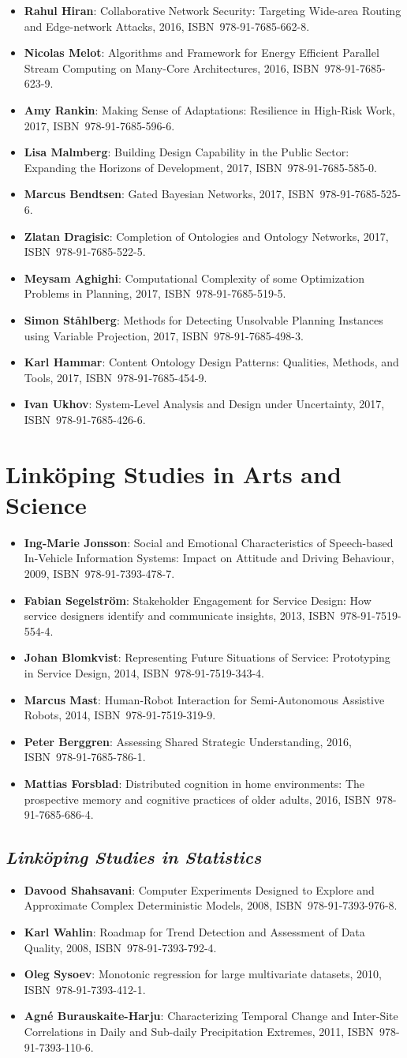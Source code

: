 \documentclass[a4paper,showtrims,twocolumn]{memoir}
\newcommand{\series}[1]{\section*{\footnotesize #1}}
\newcommand{\subseries}[1]{\subsection*{\footnotesize\normalfont\textit{#1}}}
\newenvironment{theses}{
  \begin{itemize}
    \setlength{\itemsep}{0.2em}
    \setlength{\parskip}{0em}
    \setlength{\parsep}{0em}
}{
  \end{itemize}
}
\newcommand{\thesis}[5]{\item[No.~#1] \textbf{#2}: #3, #4, ISBN~#5.}
\begin{document}
\begin{theses}
    \thesis{1798}{Rahul Hiran}{Collaborative Network Security: Targeting Wide-area Routing and Edge-network Attacks}{2016}{978-91-7685-662-8}
    \thesis{1813}{Nicolas Melot}{Algorithms and Framework for Energy Efficient Parallel Stream Computing on Many-Core Architectures}{2016}{978-91-7685-623-9}
    \thesis{1823}{Amy Rankin}{Making Sense of Adaptations: Resilience in High-Risk Work}{2017}{978-91-7685-596-6}
    \thesis{1831}{Lisa Malmberg}{Building Design Capability in the Public Sector: Expanding the Horizons of Development}{2017}{978-91-7685-585-0}
    \thesis{1851}{Marcus Bendtsen}{Gated Bayesian Networks}{2017}{978-91-7685-525-6}
    \thesis{1852}{Zlatan Dragisic}{Completion of Ontologies and Ontology Networks}{2017}{978-91-7685-522-5}
    \thesis{1854}{Meysam Aghighi}{Computational Complexity of some Optimization Problems in Planning}{2017}{978-91-7685-519-5}
    \thesis{1863}{Simon Ståhlberg}{Methods for Detecting Unsolvable Planning Instances using Variable Projection}{2017}{978-91-7685-498-3}
    \thesis{1879}{Karl Hammar}{Content Ontology Design Patterns: Qualities, Methods, and Tools}{2017}{978-91-7685-454-9}
    \thesis{1887}{Ivan Ukhov}{System-Level Analysis and Design under Uncertainty}{2017}{978-91-7685-426-6}
  \end{theses}

  \series{Linköping Studies in Arts and Science}

  \begin{theses}
    \thesis{504}{Ing-Marie Jonsson}{Social and Emotional Characteristics of Speech-based In-Vehicle Information Systems: Impact on Attitude and Driving Behaviour}{2009}{978-91-7393-478-7}
    \thesis{586}{Fabian Segelström}{Stakeholder Engagement for Service Design: How service designers identify and communicate insights}{2013}{978-91-7519-554-4}
    \thesis{618}{Johan Blomkvist}{Representing Future Situations of Service: Prototyping in Service Design}{2014}{978-91-7519-343-4}
    \thesis{620}{Marcus Mast}{Human-Robot Interaction for Semi-Autonomous Assistive Robots}{2014}{978-91-7519-319-9}
    \thesis{677}{Peter Berggren}{Assessing Shared Strategic Understanding}{2016}{978-91-7685-786-1}
    \thesis{695}{Mattias Forsblad}{Distributed cognition in home environments: The prospective memory and cognitive practices of older adults}{2016}{978-91-7685-686-4}
  \end{theses}

  \subseries{Linköping Studies in Statistics}

  \begin{theses}
    \thesis{9}{Davood Shahsavani}{Computer Experiments Designed to Explore and Approximate Complex Deterministic Models}{2008}{978-91-7393-976-8}
    \thesis{10}{Karl Wahlin}{Roadmap for Trend Detection and Assessment of Data Quality}{2008}{978-91-7393-792-4}
    \thesis{11}{Oleg Sysoev}{Monotonic regression for large multivariate datasets}{2010}{978-91-7393-412-1}
    \thesis{13}{Agné Burauskaite-Harju}{Characterizing Temporal Change and Inter-Site Correlations in Daily and Sub-daily Precipitation Extremes}{2011}{978-91-7393-110-6}
  \end{theses}
\end{document}
